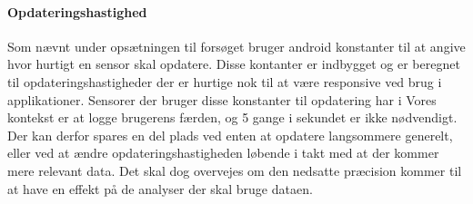 \paragraph{Opdateringshastighed}
Som nævnt under opsætningen til forsøget bruger android konstanter til at angive hvor hurtigt en sensor skal opdatere.
Disse kontanter er indbygget og er beregnet til opdateringshastigheder der er hurtige nok til at være responsive ved brug i applikationer.
Sensorer der bruger disse konstanter til opdatering har i 
Vores kontekst er at logge brugerens færden, og 5 gange i sekundet er ikke nødvendigt.
Der kan derfor spares en del plads ved enten at opdatere langsommere generelt, eller ved at ændre opdateringshastigheden løbende i takt med at der kommer mere relevant data.
Det skal dog overvejes om den nedsatte præcision kommer til at have en effekt på de analyser der skal bruge dataen.